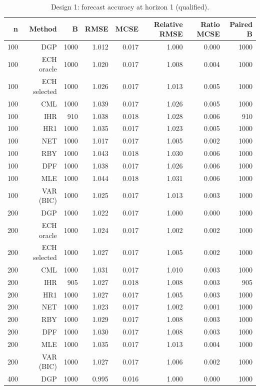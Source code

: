 \begin{table}[p]\centering
\caption{Design 1: forecast accuracy at horizon 1 (qualified).}
\small
\begin{tabular}{rrrrrrrr}\toprule
n & Method & B & RMSE & MCSE & Relative RMSE & Ratio MCSE & Paired B \\\midrule
100 & DGP & 1000 & 1.012 & 0.017 & 1.000 & 0.000 & 1000 \\
100 & ECH oracle & 1000 & 1.020 & 0.017 & 1.008 & 0.004 & 1000 \\
100 & ECH selected & 1000 & 1.026 & 0.017 & 1.013 & 0.005 & 1000 \\
100 & CML & 1000 & 1.039 & 0.017 & 1.026 & 0.005 & 1000 \\
100 & IHR &  910 & 1.038 & 0.018 & 1.028 & 0.006 &  910 \\
100 & HR1 & 1000 & 1.035 & 0.017 & 1.023 & 0.005 & 1000 \\
100 & NET & 1000 & 1.017 & 0.017 & 1.005 & 0.002 & 1000 \\
100 & RBY & 1000 & 1.043 & 0.018 & 1.030 & 0.006 & 1000 \\
100 & DPF & 1000 & 1.038 & 0.017 & 1.026 & 0.006 & 1000 \\
100 & MLE & 1000 & 1.044 & 0.018 & 1.031 & 0.006 & 1000 \\
100 & VAR (BIC) & 1000 & 1.025 & 0.017 & 1.013 & 0.003 & 1000 \\
200 & DGP & 1000 & 1.022 & 0.017 & 1.000 & 0.000 & 1000 \\
200 & ECH oracle & 1000 & 1.024 & 0.017 & 1.002 & 0.002 & 1000 \\
200 & ECH selected & 1000 & 1.027 & 0.017 & 1.005 & 0.002 & 1000 \\
200 & CML & 1000 & 1.031 & 0.017 & 1.010 & 0.003 & 1000 \\
200 & IHR &  905 & 1.027 & 0.018 & 1.008 & 0.003 &  905 \\
200 & HR1 & 1000 & 1.027 & 0.017 & 1.005 & 0.003 & 1000 \\
200 & NET & 1000 & 1.023 & 0.017 & 1.002 & 0.001 & 1000 \\
200 & RBY & 1000 & 1.029 & 0.017 & 1.008 & 0.003 & 1000 \\
200 & DPF & 1000 & 1.030 & 0.017 & 1.008 & 0.003 & 1000 \\
200 & MLE & 1000 & 1.035 & 0.017 & 1.013 & 0.004 & 1000 \\
200 & VAR (BIC) & 1000 & 1.027 & 0.017 & 1.006 & 0.002 & 1000 \\
400 & DGP & 1000 & 0.995 & 0.016 & 1.000 & 0.000 & 1000 \\

\end{tabular}
\end{table}
